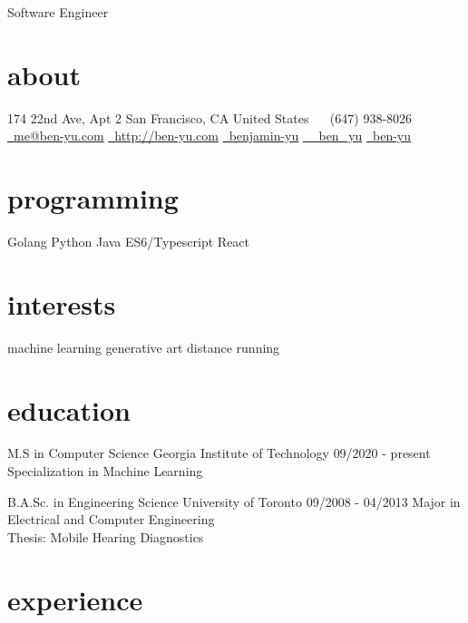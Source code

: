 \documentclass[11pt, print]{friggeri-cv}
\begin{document}
\pdfpagewidth=8.5in
\pdfpageheight=11in
{Software Engineer}

\begin{aside}
  \section{about}
    174 22nd Ave, Apt 2
    San Francisco, CA
    United States
    ~
    \symbolfont\faPhone\bodyfont\ (647) 938-8026
    \href{mailto:me@ben-yu.com}{\symbolfont\faEnvelope\bodyfont\ me@ben-yu.com}
    \href{http://ben-yu.com}{\symbolfont\faGlobe \bodyfont\ http://ben-yu.com}
    \href{http://www.linkedin.com/pub/benjamin-yu/20/9b0/153}{\symbolfont{\faLinkedin} \bodyfont\ benjamin-yu}
    \href{http://twitter.com/_ben_yu}{\symbolfont\faTwitter \bodyfont\ \_ben\_yu}
    \href{https://github.com/ben-yu}{\symbolfont{\faGithub} \bodyfont\ ben-yu}
  \section{programming}
    Golang
    Python
    Java
    ES6/Typescript
    React
  \section{interests}
    machine learning
    generative art
    distance running
\end{aside}

\section{education}

\begin{entrylist}
  \entry
    {M.S in Computer Science}
    {Georgia Institute of Technology}
    {09/2020 - present}
    {Specialization in Machine Learning}

  \entry
    {B.A.Sc. in Engineering Science}
    {University of Toronto}
    {09/2008 - 04/2013}
    {Major in Electrical and Computer Engineering \\
     Thesis: Mobile Hearing Diagnostics}

\end{entrylist}

\section{experience}
\end{document}
